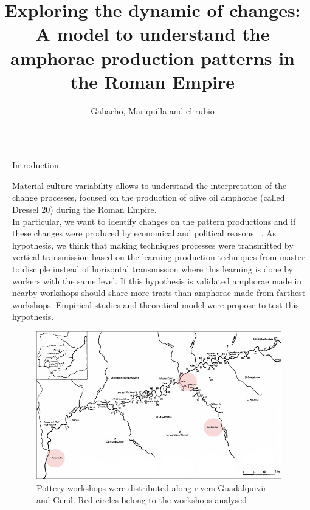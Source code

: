 \documentclass[final]{beamer}
\title{Exploring the dynamic of changes: A model to understand the amphorae production patterns in the Roman Empire} %
\author{Gabacho, Mariquilla and el rubio} %
\institute{Barcelona Supercomputing Center - University of Barcelona} %
\newlength{\sepwid}
\newlength{\onecolwid}
\begin{document}

\setlength{\belowcaptionskip}{2ex} %
\setlength\belowdisplayshortskip{2ex} %

\begin{frame}[t] %

\begin{columns}[t] %

\begin{column}{\sepwid}\end{column} %

\begin{column}{\onecolwid} %


\begin{block}{Introduction}

Material culture variability allows to understand the interpretation of the change processes, focused on the production of olive oil amphorae (called Dressel 20) during the Roman Empire. \\
In particular, we want to identify changes on the pattern productions and if these changes were produced by economical and political reasons ~\cite{schillinger}. As
hypothesis, we think that making techniques processes were transmitted by vertical transmission based on the learning production techniques from master to disciple instead of horizontal transmission where this learning is done by workers with the same level. If this hypothesis is validated amphorae made in nearby workshops should share more traits than amphorae made from farthest workshops. Empirical studies and theoretical model were propose to test this hypothesis. 
\end{block}

\begin{figure}
\includegraphics[width=0.4\linewidth]{images/fig1.png}
\caption{Pottery workshops were distributed along rivers Guadalquivir and Genil. Red circles belong to the workshops analysed}
\end{figure}



\end{column}
\end{columns}
\end{frame}
\end{document}
